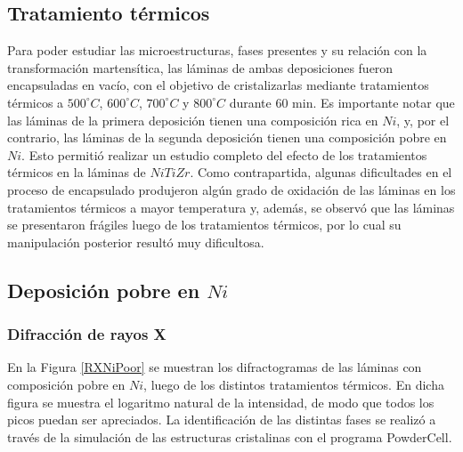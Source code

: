\documentclass[12pt]{article}
\theoremstyle{definition}
\theoremstyle{remark}
\begin{document}
{\subsection{Tratamiento térmicos}

Para poder estudiar las microestructuras, fases presentes y su relación con la transformación martensítica, las láminas de ambas deposiciones fueron encapsuladas en vacío, con el objetivo de cristalizarlas mediante tratamientos térmicos a $500 ^\circ C$, $600 ^\circ C$, $700 ^\circ C$ y $800 ^\circ C$ durante $60$ min. Es importante notar que las láminas de la primera deposición tienen una composición rica en $Ni$, y, por el contrario, las láminas de la segunda deposición tienen una composición pobre en $Ni$. Esto permitió realizar un estudio completo del efecto de los tratamientos térmicos en la láminas de $NiTiZr$. Como contrapartida, algunas dificultades en el proceso de encapsulado produjeron algún grado de oxidación de las láminas en los tratamientos térmicos a mayor temperatura y, además, se observó que las láminas se presentaron frágiles luego de los tratamientos térmicos, por lo cual su manipulación posterior resultó muy dificultosa.

\subsection{Deposición pobre en $Ni$}
\subsubsection{Difracción de rayos X}
En la Figura \ref{RXNiPoor} se muestran los difractogramas de las láminas con composición pobre en $Ni$, luego de los distintos tratamientos térmicos. En dicha figura se muestra el logaritmo natural de la intensidad, de modo que todos los picos puedan ser apreciados. La identificación de las distintas fases se realizó a través de la simulación de las estructuras cristalinas con el programa PowderCell.

}
\end{document}
